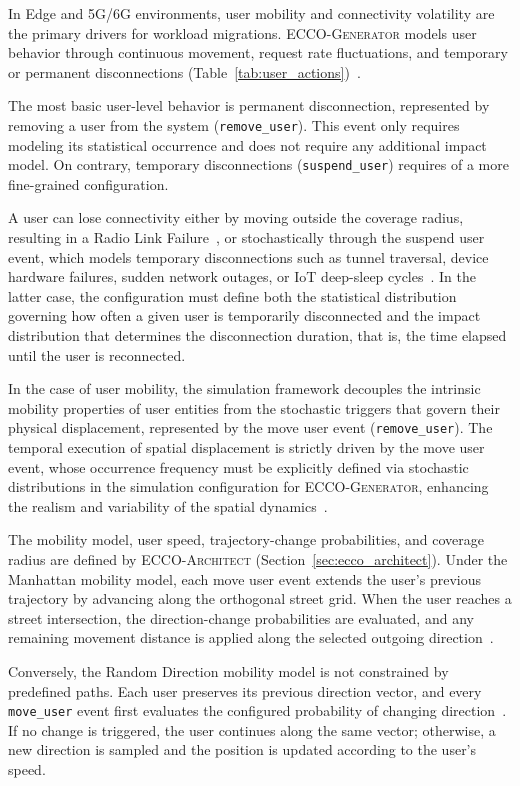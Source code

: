 \documentclass[ASNA]{USG} %
\begin{document}
In Edge and 5G/6G environments, user mobility and connectivity volatility are the primary drivers for workload migrations. \textsc{ECCO-Generator} models user behavior through continuous movement, request rate fluctuations, and temporary or permanent disconnections (Table~\ref{tab:user_actions})~\cite{Haibeh2022A}.

The most basic user-level behavior is permanent disconnection, represented by removing a user from the system (\texttt{remove\_user}). This event only requires modeling its statistical occurrence and does not require any additional impact model. On contrary, temporary disconnections (\texttt{suspend\_user}) requires of a more fine-grained configuration.

A user can lose connectivity either by moving outside the coverage radius, resulting in a Radio Link Failure~\cite{Ampratwum2025Radio}, or stochastically through the suspend user event, which models temporary disconnections such as tunnel traversal, device hardware failures, sudden network outages, or IoT deep-sleep cycles~\cite{Haibeh2022A}. In the latter case, the configuration must define both the statistical distribution governing how often a given user is temporarily disconnected and the impact distribution that determines the disconnection duration, that is, the time elapsed until the user is reconnected.


In the case of user mobility, the simulation framework decouples the intrinsic mobility properties of user entities from the stochastic triggers that govern their physical displacement, represented by the move user event (\texttt{remove\_user}). The temporal execution of spatial displacement is strictly driven by the move user event, whose occurrence frequency must be explicitly defined via stochastic distributions in the simulation configuration for \textsc{ECCO-Generator}, enhancing the realism and variability of the spatial dynamics~\cite{Bettstetter2004Stochastic}.


The mobility model, user speed, trajectory-change probabilities, and coverage radius are defined by \textsc{ECCO-Architect} (Section~\ref{sec:ecco_architect}). Under the Manhattan mobility model, each move user event extends the user's previous trajectory by advancing along the orthogonal street grid. When the user reaches a street intersection, the direction-change probabilities are evaluated, and any remaining movement distance is applied along the selected outgoing direction~\cite{Kim2009Realistic}.

Conversely, the Random Direction mobility model is not constrained by predefined paths. Each user preserves its previous direction vector, and every \texttt{move\_user} event first evaluates the configured probability of changing direction~\cite{Khan2016Modeling}. If no change is triggered, the user continues along the same vector; otherwise, a new direction is sampled and the position is updated according to the user's speed.
\end{document}
